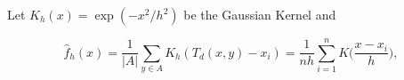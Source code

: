 Let  $K_h(x) = \exp( -x^2/h^2)$ be the Gaussian Kernel and

\[
    \hat{f}_h(x) = \frac{1}{|A|}\sum_{ y \in A} K_h (T_d(x,y)- x_i) = \frac{1}{nh} \sum_{i=1}^n K\Big(\frac{x-x_i}{h}\Big),
  \]